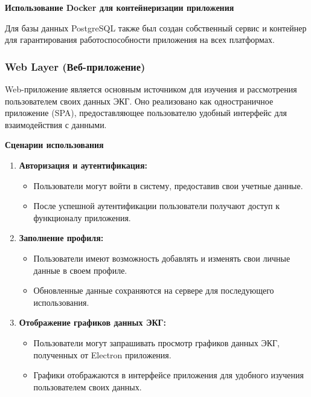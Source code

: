 \documentclass[12pt, russian]{extarticle}
\begin{document}
\begin{spacing}{1.5}
\par \noindent \textbf{Использование Docker для контейнеризации приложения}

Для базы данных PostgreSQL также был создан собственный сервис и контейнер для гарантирования работоспособности приложения на всех платформах.


\subsubsection{Web Layer (Веб-приложение)}

Web-приложение является основным источником для изучения и рассмотрения пользователем своих данных ЭКГ. Оно реализовано как одностраничное приложение (SPA), предоставляющее пользователю удобный интерфейс для взаимодействия с данными. 

\par \noindent \textbf{Сценарии использования}

\begin{enumerate}
    \item \textbf{Авторизация и аутентификация:}
    \begin{itemize}
        \item Пользователи могут войти в систему, предоставив свои учетные данные.
        \item После успешной аутентификации пользователи получают доступ к функционалу приложения.
    \end{itemize}

    \item \textbf{Заполнение профиля:}
    \begin{itemize}
        \item Пользователи имеют возможность добавлять и изменять свои личные данные в своем профиле.
        \item Обновленные данные сохраняются на сервере для последующего использования.
    \end{itemize}

    \item \textbf{Отображение графиков данных ЭКГ:}
    \begin{itemize}
        \item Пользователи могут запрашивать просмотр графиков данных ЭКГ, полученных от Electron приложения.
        \item Графики отображаются в интерфейсе приложения для удобного изучения пользователем своих данных.
    \end{itemize}


\end{enumerate}
\end{spacing}
\end{document}

